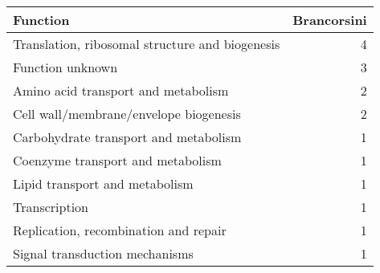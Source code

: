 \begin{table}[ht]
\centering
\begin{tabular}{lr}
  \hline
Function & Brancorsini \\ 
  \hline
Translation, ribosomal structure and biogenesis &   4 \\ 
  Function unknown &   3 \\ 
  Amino acid transport and metabolism &   2 \\ 
  Cell wall/membrane/envelope biogenesis &   2 \\ 
  Carbohydrate transport and metabolism &   1 \\ 
  Coenzyme transport and metabolism &   1 \\ 
  Lipid transport and metabolism &   1 \\ 
  Transcription &   1 \\ 
  Replication, recombination and repair &   1 \\ 
  Signal transduction mechanisms &   1 \\ 
   \hline
\end{tabular}
\end{table}
